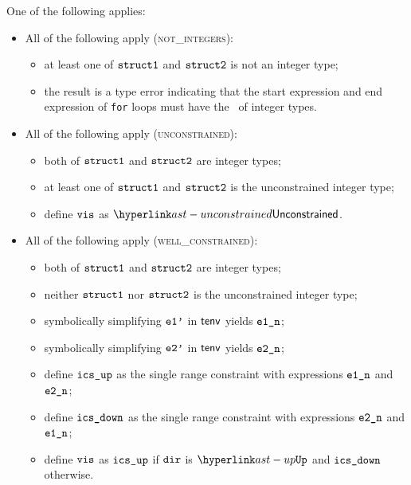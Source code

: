 \ProseParagraph
One of the following applies:
\begin{itemize}
  \item All of the following apply (\textsc{not\_integers}):
  \begin{itemize}
    \item at least one of $\structone$ and $\structtwo$ is not an integer type;
    \item the result is a type error indicating that the start expression and end expression of \texttt{for} loops
          must have the \structure\ of integer types.
  \end{itemize}

  \item All of the following apply (\textsc{unconstrained}):
  \begin{itemize}
    \item both of $\structone$ and $\structtwo$ are integer types;
    \item at least one of $\structone$ and $\structtwo$ is the unconstrained integer type;
    \item define $\vis$ as $\unconstrained$.
  \end{itemize}

  \item All of the following apply (\textsc{well\_constrained}):
  \begin{itemize}
    \item both of $\structone$ and $\structtwo$ are integer types;
    \item neither $\structone$ nor $\structtwo$ is the unconstrained integer type;
    \item symbolically simplifying $\veonep$ in $\tenv$ yields $\eonen$\ProseOrTypeError;
    \item symbolically simplifying $\vetwop$ in $\tenv$ yields $\etwon$\ProseOrTypeError;
    \item define $\icsup$ as the single range constraint with expressions $\eonen$ and $\etwon$;
    \item define $\icsdown$ as the single range constraint with expressions $\etwon$ and $\eonen$;
    \item define $\vis$ as $\icsup$ if $\dir$ is $\UP$ and $\icsdown$ otherwise.
  \end{itemize}
\end{itemize}

\FormallyParagraph
\begin{mathpar}
\end{mathpar}

